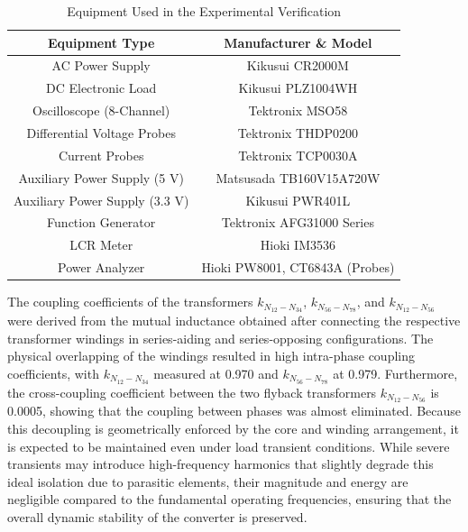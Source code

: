 \documentclass[lettersize,journal]{IEEEtran}
\begin{document}
\begin{table}[t!] %
    \caption{Equipment Used in the Experimental Verification}
    \centering
    \footnotesize
    \setlength{\tabcolsep}{3pt}
    \begin{tabular}{cc}
        \hline
        \textbf{Equipment Type} & \textbf{Manufacturer \& Model} \\
        \hline \hline
        AC Power Supply & Kikusui CR2000M \\
        DC Electronic Load & Kikusui PLZ1004WH \\
        Oscilloscope (8-Channel) & Tektronix MSO58 \\
        Differential Voltage Probes & Tektronix THDP0200 \\
        Current Probes & Tektronix TCP0030A \\
        Auxiliary Power Supply (5 V) & Matsusada TB160V15A720W \\
        Auxiliary Power Supply (3.3 V) & Kikusui PWR401L \\
        Function Generator & Tektronix AFG31000 Series \\
        LCR Meter & Hioki IM3536 \\
        Power Analyzer & Hioki PW8001,  CT6843A (Probes)  \\
        \hline
    \end{tabular}
    \label{tab:equipment}
\end{table}

The coupling coefficients of the transformers $k_{N_{12}-N_{34}}$, $k_{N_{56}-N_{78}}$, and $k_{N_{12}-N_{56}}$ were derived from the mutual inductance obtained after connecting the respective transformer windings in series-aiding and series-opposing configurations. The physical overlapping of the windings resulted in high intra-phase coupling coefficients, with $k_{N_{12}-N_{34}}$ measured at 0.970 and $k_{N_{56}-N_{78}}$ at 0.979. Furthermore, the cross-coupling coefficient between the two flyback transformers $k_{N_{12}-N_{56}}$ is 0.0005, showing that the coupling between phases was almost eliminated. Because this decoupling is geometrically enforced by the core and winding arrangement, it is expected to be maintained even under load transient conditions. While severe transients may introduce high-frequency harmonics that slightly degrade this ideal isolation due to parasitic elements, their magnitude and energy are negligible compared to the fundamental operating frequencies, ensuring that the overall dynamic stability of the converter is preserved.
\end{document}
